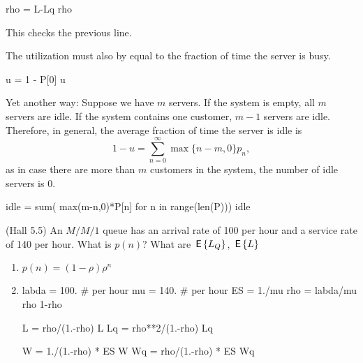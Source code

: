 \begin{exercise}
\begin{solution}
\begin{pyconsole}
rho = L-Lq
rho
\end{pyconsole}
This checks the previous line.

The utilization must also by equal to the fraction of time the server is busy. 
\begin{pyconsole}
u = 1 - P[0]
u
\end{pyconsole}

Yet another way: Suppose we have $m$ servers. If the system is empty,
all $m$ servers are idle. If the system contains one customer, $m-1$
servers are idle. Therefore, in general, the average fraction of time
the server is idle is
\begin{equation*}
1- u = \sum_{n=0}^\infty \max\{n-m, 0\}  p_n,
\end{equation*}
as in case there are more than $m$ customers in the system, the
number of idle servers is $0$.


\begin{pyconsole}
idle = sum( max(m-n,0)*P[n] for n in range(len(P)))
idle
\end{pyconsole}

   \end{solution}
 
\end{exercise}

\begin{exercise}
  (Hall 5.5) An $M/M/1$ queue has an arrival rate of 100 per hour and
  a service rate of 140 per hour.
 What is $p(n)$?  What are $\,\mathsf{E}\left\{L_Q\right\}$, $\,\mathsf{E}\left\{L\right\}$ 
\begin{solution}
  \begin{enumerate}
  \item 
$p(n) = (1-\rho)\rho^n$

\item 

\begin{pyconsole}
labda = 100. # per hour
mu = 140. # per hour
ES = 1./mu
rho = labda/mu
rho 
1-rho

L = rho/(1.-rho)
L
Lq = rho**2/(1.-rho)
Lq

W = 1./(1.-rho) * ES
W
Wq = rho/(1.-rho) * ES
Wq
\end{pyconsole}
  \end{enumerate}
  \end{solution}
\end{exercise}

